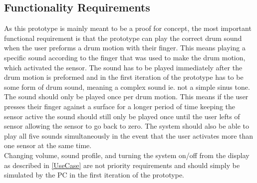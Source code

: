 \subsection{Functionality Requirements}
\label{Krav_til_funktionalitet}
As this prototype is mainly meant to be a proof for concept, the most important functional requirement is that the prototype can play the correct drum sound when the user preforms a drum motion with their finger. This means playing a specific sound according to the finger that was used to make the drum motion, which activated the sensor. The sound has to  be played immediately after the drum motion is preformed and in the first iteration of the prototype has to be some form of drum sound, meaning a complex sound ie. not a simple sinus tone. The sound should only be played once per drum motion. This means if the user presses their finger against a surface for a longer period of time keeping  the sensor active the sound should still only be played once until the user lefts of sensor allowing the sensor to go back to zero. The system should also be able to play all five sounds simultaneously in the event that the user activates more than one sensor at the same time.\\
Changing volume, sound profile, and turning the system on/off from the display as described in \autoref{UseCase} are not priority requirements and should simply be simulated by the PC in the first iteration of the prototype.



